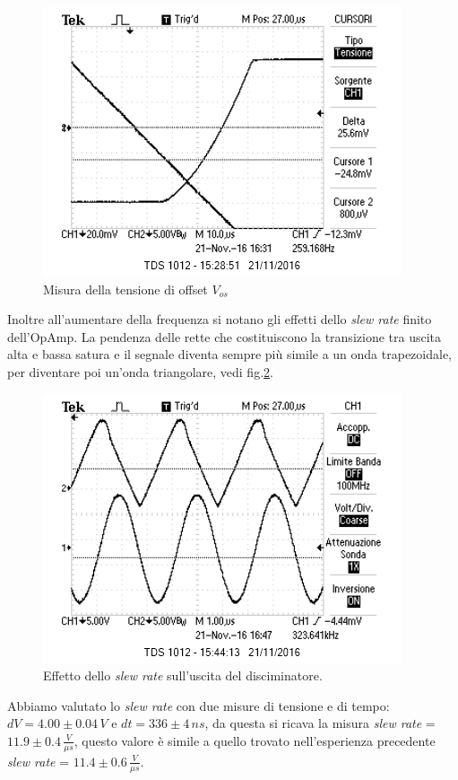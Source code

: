\documentclass[10pt,a4paper]{article}
\begin{document}
\begin{figure}[h]
\centering
\includegraphics[scale=1.0]{immagini/Vos.png}
\caption{Misura della tensione di offset $V_{os}$}
\label{Vos}
\end{figure}

Inoltre all'aumentare della frequenza si notano gli effetti dello \emph{slew rate} finito dell'OpAmp. La pendenza delle rette che costituiscono la transizione tra uscita alta e bassa satura e il segnale diventa sempre più simile a un onda trapezoidale, per diventare poi un'onda triangolare, vedi fig.\ref{slewRate}.

\begin{figure}[h]
\centering
\includegraphics[scale=1.0]{immagini/slewRate.png}
\caption{Effetto dello \emph{slew rate} sull'uscita del disciminatore.}
\label{slewRate}
\end{figure}

Abbiamo valutato lo \emph{slew rate} con due misure di tensione e di tempo: $dV = 4.00 \pm 0.04 \, V$ e $dt = 336 \pm 4 \, ns$, da questa si ricava la misura \emph{slew rate} = $11.9 \pm 0.4 \, \frac{V}{\mu s}$, questo valore è simile a quello trovato nell'esperienza precedente \emph{slew rate} = $11.4 \pm 0.6 \, \frac{V}{\mu s}$.
\end{document}
